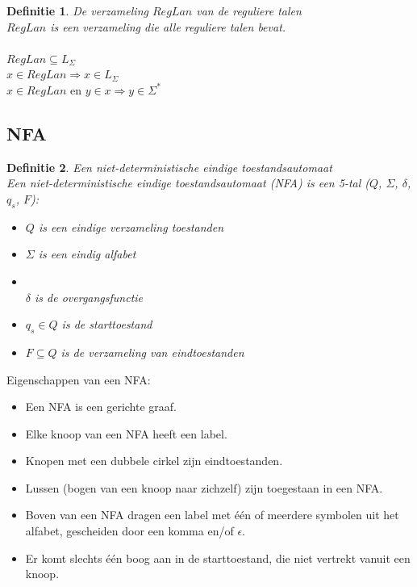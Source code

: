 \documentclass[a4paper]{article}
\newtheorem{tdefinitie}{Definitie}[section]
\newenvironment{definitie}[1]%
  {\begin{mdframed}[backgroundcolor=silver,
    topline=false,
    rightline=false,
    leftline=false,
    bottomline=false]\begin{tdefinitie}#1\\\normalfont}%
  {\end{tdefinitie}\end{mdframed}}
\newcommand{\powerset}{\ensuremath{\mathcal{P}}}
\newcommand{\en}{\ensuremath{\text{ en }}}
\newcommand{\sstar}{\ensuremath{\Sigma^*}}
\begin{document}
\begin{definitie}{De verzameling $RegLan$ van de reguliere talen}
  $RegLan$ is een verzameling die alle reguliere talen bevat. \\
  \\ $RegLan \subseteq L_\Sigma$
  \\ $x \in RegLan \Rightarrow x \in L_\Sigma$
  \\ $x \in RegLan \en y \in x \Rightarrow y \in \sstar$
\end{definitie}


\subsection{NFA}

\begin{definitie}{Een niet-deterministische eindige toestandsautomaat}
  Een niet-deterministische eindige toestandsautomaat (NFA) is een 5-tal ($Q$, $\Sigma$, $\delta$, $q_s$, $F$):
  \begin{itemize}
  \item $Q$ is een eindige verzameling toestanden
  \item $\Sigma$ is een eindig alfabet
  \item \bm{$\delta : Q \times \Sigma_\epsilon \rightarrow \powerset(Q)$}\\$\delta$ is de overgangsfunctie
  \item $q_s \in Q$ is de starttoestand
  \item $F \subseteq Q$ is de verzameling van eindtoestanden
  \end{itemize}
\end{definitie}

Eigenschappen van een NFA:
\begin{itemize}
\item Een NFA is een gerichte graaf.
\item Elke knoop van een NFA heeft een label.
\item Knopen met een dubbele cirkel zijn eindtoestanden.
\item Lussen (bogen van een knoop naar zichzelf) zijn toegestaan in een NFA.
\item Boven van een NFA dragen een label met \'e\'en of meerdere symbolen uit het alfabet, gescheiden door een komma en/of $\epsilon$.
\item Er komt slechts \'e\'en boog aan in de starttoestand, die niet vertrekt vanuit een knoop.
\end{itemize}
\end{document}

